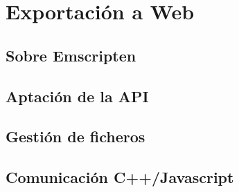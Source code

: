 \section{Exportación a Web}

\subsection{Sobre Emscripten}

\subsection{Aptación de la API}

\subsection{Gestión de ficheros}

\subsection{Comunicación C++/Javascript}
